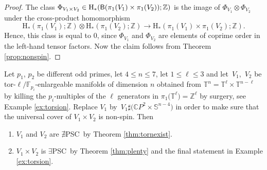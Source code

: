 \documentclass[10pt,a4paper]{amsart}
\numberwithin{equation}{section}
\newcommand{\F}{\mathbb{F}}
\newcommand{\Z}{\mathbb{Z}}
\newcommand{\SSS}{\mathbb{S}}
\newcommand{\TTT}{\mathbb{T}}
\newcommand{\sB}{{\sf B}}
\newcommand{\myicon}{$\,\,\,\triangleright$}
\newcommand{\no}{{\color{brown!70!black}$\nexists$}{\sf PSC}}
\newcommand{\yes}{{\color {blue!70!black}$\exists$}{\sf PSC}}
\newcommand{\Ho}{\mathrm{H}}
\begin{document}
\begin{proof} The class $\Phi_{V_1 \times V_2} \in \Ho_*(\sB ( \pi_1(V_1) \times \pi_1(V_2)); \Z)$ is the image of $\Phi_{V_1} \otimes \Phi_{V_2}$ under the cross-product homomorphism
\[
 \Ho_*( \pi_1(V_1); \Z) \otimes \Ho_* ( \pi_1(V_2); \Z) \to \Ho_* ( \pi_1(V_1) \times \pi_1(V_2); \Z) .
\]
Hence, this class is equal to $0$, since $\Phi_{V_1}$ and $\Phi_{V_2}$ are elements of coprime order in the left-hand tensor factors.
Now the claim follows from Theorem \ref{prop:nonspin}.
\end{proof}

\begin{Example} \label{interesting}
Let $p_1$, $p_2$ be different odd primes, let $4 \leq n \leq 7$, let $1 \leq \ell \leq 3$ and let~$V_1$,~$V_2 $ be tor-$\ell /\F_{p_i}$-enlargeable manifolds of dimension $n$ obtained from ${\TTT}^{n} = {\TTT}^{\ell} \times {\TTT}^{n-\ell}$ by killing the $p_i$-multiples of the $\ell$ generators in $\pi_1\big({\TTT}^\ell\big) =\Z^{\ell}$ by surgery, see Example \ref{ex:torsion}.
Replace $V_1$ by~${V_1 \sharp \big( \mathbb{C}P^2 \times \SSS^{n-4} \big)}$ in order to make sure that the universal cover of $V_1 \times V_2$ is non-spin.
Then
\begin{enumerate}[\myicon]\itemsep=0pt
 \item $V_1$ and $V_2$ are \no~by Theorem \ref{thm:tornexist}.
 \item $V_1 \times V_2$ is \yes~by Theorem \ref{thm:plenty} and the final statement in Example \ref{ex:torsion}.
\end{enumerate}
\end{Example}
\end{document}
